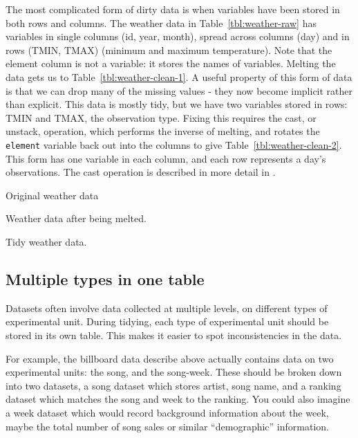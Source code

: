 \documentclass[oneside]{article}
\begin{document}
The most complicated form of dirty data is when variables have been stored in both rows and columns. The weather data in Table~\ref{tbl:weather-raw} has variables in single columns (id, year, month), spread across columns (day) and in rows (TMIN, TMAX) (minimum and maximum temperature). Note that the element column is not a variable: it stores the names of variables. Melting the data gets us to Table~\ref{tbl:weather-clean-1}. A useful property of this form of data is that we can drop many of the missing values - they now become implicit rather than explicit. This data is mostly tidy, but we have two variables stored in rows: TMIN and TMAX, the observation type. Fixing this requires the cast, or unstack, operation, which performs the inverse of melting, and rotates the {\tt element} variable back out into the columns to give Table~\ref{tbl:weather-clean-2}. This form has one variable in each column, and each row represents a day's observations. The cast operation is described in more detail in \citet{wickham:2007b}.

\begin{table}[htbp]
  \centering
  
  \caption{Original weather data}
  \label{tbl:weather-raw}
\end{table}

\begin{table}[htbp]
  \centering
  
  \caption{Weather data after being melted.}
  \label{tbl:weather-clean-1}
\end{table}

\begin{table}[htbp]
  \centering
  
  \caption{Tidy weather data.}
  \label{tbl:weather-clean-2}
\end{table}

\subsection{Multiple types in one table}

Datasets often involve data collected at multiple levels, on different types of experimental unit. During tidying, each type of experimental unit should be stored in its own table. This makes it easier to spot inconsistencies in the data.

For example, the billboard data describe above actually contains data on two experimental units: the song, and the song-week. These should be broken down into two datasets, a song dataset which stores artist, song name, and a ranking dataset which matches the song and week to the ranking. You could also imagine a week dataset which would record background information about the week, maybe the total number of song sales or similar ``demographic'' information.
\end{document}
